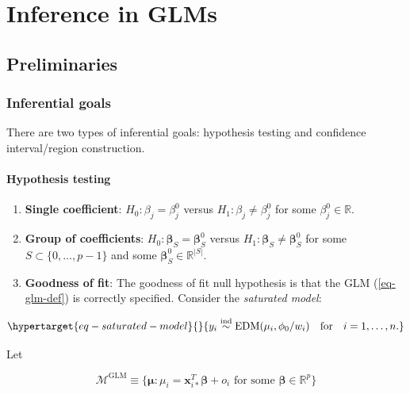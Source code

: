 \documentclass[
  11pt,
  letterpaper,
  oneside]{book}
\providecommand{\tightlist}{%
  \setlength{\itemsep}{0pt}\setlength{\parskip}{0pt}}\usepackage{longtable,booktabs,array}
\theoremstyle{plain}
\theoremstyle{plain}
\theoremstyle{definition}
\theoremstyle{definition}
\theoremstyle{plain}
\theoremstyle{remark}
\begin{document}
\hypertarget{sec-glm-inf}{%
\chapter{Inference in GLMs}\label{sec-glm-inf}}

\hypertarget{sec-preliminaries}{%
\section{Preliminaries}\label{sec-preliminaries}}

\hypertarget{sec-inferential-goals}{%
\subsection{Inferential goals}\label{sec-inferential-goals}}

There are two types of inferential goals: hypothesis testing and
confidence interval/region construction.

\hypertarget{sec-hypothesis-testing}{%
\subsubsection{Hypothesis testing}\label{sec-hypothesis-testing}}

\begin{enumerate}
\def\labelenumi{\arabic{enumi}.}
\tightlist
\item
  \textbf{Single coefficient}: \(H_0: \beta_j = \beta_j^0\) versus
  \(H_1: \beta_j \neq \beta_j^0\) for some \(\beta_j^0 \in \mathbb{R}\).
\item
  \textbf{Group of coefficients}:
  \(H_0: \boldsymbol{\beta}_S = \boldsymbol{\beta}_S^0\) versus
  \(H_1: \boldsymbol{\beta}_S \neq \boldsymbol{\beta}_S^0\) for some
  \(S \subset \{0,\dots,p-1\}\) and some
  \(\boldsymbol{\beta}_S^0 \in \mathbb{R}^{|S|}\).
\item
  \textbf{Goodness of fit}: The goodness of fit null hypothesis is that
  the GLM (\ref{eq-glm-def}) is correctly specified. Consider the
  \emph{saturated model}:
\end{enumerate}

\begin{equation}\protect\hypertarget{eq-saturated-model}{}{
y_i \overset{\text{ind}} \sim \text{EDM}(\mu_i, \phi_0/w_i) \quad \text{for} \quad i = 1,\dots,n.
}\label{eq-saturated-model}\end{equation}

Let

\[
\mathcal{M}^{\text{GLM}} \equiv \{\boldsymbol{\mu}: \mu_i = \boldsymbol{x}_{i*}^T \boldsymbol{\beta} + o_i \text{ for some } \boldsymbol{\beta} \in \mathbb{R}^p\}
\]
\end{document}
